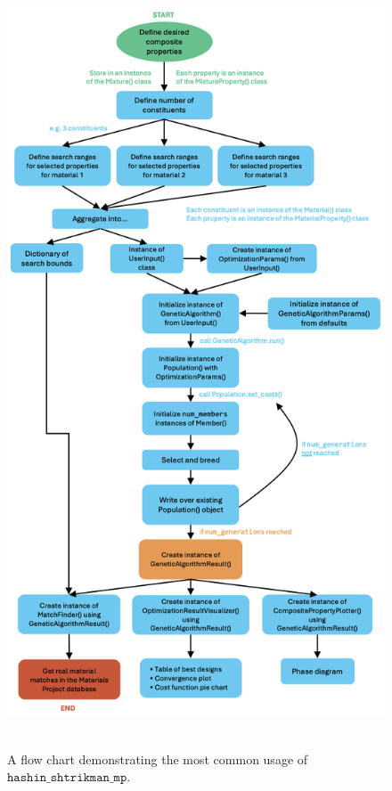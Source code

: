 \documentclass[letterpaper,12pt]{formatfile}
\begin{document}
\pagebreak
\begin{figure}[H]
    \centering
    \includegraphics[height=9in]{figures/hashin_shtrikman_mp_flow_chart.png}
    \caption{A flow chart demonstrating the most common usage of $\texttt{hashin\_shtrikman\_mp}$.}
    \label{fig:flow-chart}
\end{figure}

\end{document}

